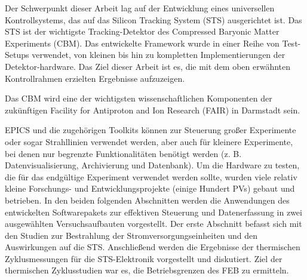 Der Schwerpunkt dieser Arbeit lag auf der Entwicklung eines universellen Kontrollsystems, das auf das Silicon Tracking System (STS) ausgerichtet ist. Das STS ist der wichtigste Tracking-Detektor des Compressed Baryonic Matter Experiments (CBM). Das entwickelte Framework wurde in einer Reihe von Test-Setups verwendet, von kleinen bis hin zu kompletten Implementierungen der Detektor-hardware. Das Ziel dieser Arbeit ist es, die mit dem oben erwähnten Kontrollrahmen erzielten Ergebnisse aufzuzeigen.

Das CBM wird eine der wichtigsten wissenschaftlichen Komponenten der zukünftigen Facility for Antiproton and Ion Research (FAIR) in Darmstadt sein. 


EPICS und die zugehörigen Toolkits können zur Steuerung großer Experimente oder sogar Strahllinien verwendet werden, aber auch für kleinere Experimente, bei denen nur begrenzte Funktionalitäten benötigt werden (z. B. Datenvisualisierung, Archivierung und Datenbank). Um die Hardware zu testen, die für das endgültige Experiment verwendet werden sollte, wurden viele relativ kleine Forschungs- und Entwicklungsprojekte (einige Hundert PVs) gebaut und betrieben. In den beiden folgenden Abschnitten werden die Anwendungen des entwickelten Softwarepakets zur effektiven Steuerung und Datenerfassung in zwei ausgewählten Versuchsaufbauten vorgestellt. Der erste Abschnitt befasst sich mit den Studien zur Bestrahlung der Stromversorgungseinheiten und den Auswirkungen auf die STS. Anschließend werden die Ergebnisse der thermischen Zyklusmessungen für die STS-Elektronik vorgestellt und diskutiert. Ziel der thermischen Zyklusstudien war es, die Betriebsgrenzen des FEB zu ermitteln.